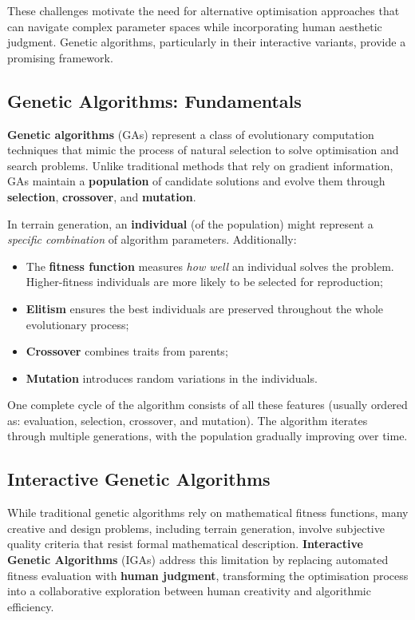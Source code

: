 These challenges motivate the need for alternative optimisation approaches that can navigate complex parameter spaces while incorporating human aesthetic judgment. Genetic algorithms, particularly in their interactive variants, provide a promising framework.

\subsection{Genetic Algorithms: Fundamentals}
\label{genetic_algorithms_fundamentals}

\textbf{Genetic algorithms} (GAs) represent a class of evolutionary computation techniques that mimic the process of natural selection to solve optimisation and search problems. Unlike traditional methods that rely on gradient information, GAs maintain a \textbf{population} of candidate solutions and evolve them through \textbf{selection}, \textbf{crossover}, and \textbf{mutation}.

In terrain generation, an \textbf{individual} (of the population) might represent a \textit{specific combination} of algorithm parameters. Additionally: 

\begin{itemize}
    \item The \textbf{fitness function} measures \textit{how well} an individual solves the problem. Higher-fitness individuals are more likely to be selected for reproduction; 
    \item \textbf{Elitism} ensures the best individuals are preserved throughout the whole evolutionary process;
    \item \textbf{Crossover} combines traits from parents;
    \item \textbf{Mutation} introduces random variations in the individuals.
\end{itemize}

One complete cycle of the algorithm consists of all these features (usually ordered as: evaluation, selection, crossover, and mutation). The algorithm iterates through multiple generations, with the population gradually improving over time.

\subsection{Interactive Genetic Algorithms}
\label{interactive_genetic_algorithms}

While traditional genetic algorithms rely on mathematical fitness functions, many creative and design problems, including terrain generation, involve subjective quality criteria that resist formal mathematical description. \textbf{Interactive Genetic Algorithms} (IGAs) address this limitation by replacing automated fitness evaluation with \textbf{human judgment}, transforming the optimisation process into a collaborative exploration between human creativity and algorithmic efficiency. 


